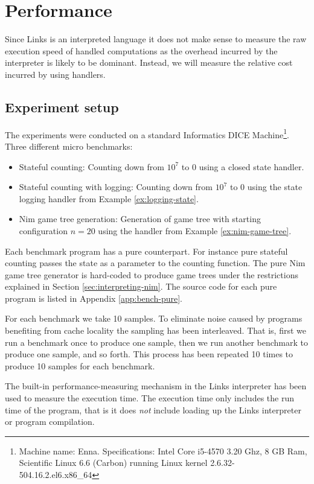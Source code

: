 \section{Performance}\label{sec:eval-performance}
Since Links is an interpreted language it does not make sense to measure the raw execution speed of handled computations as the overhead incurred by the interpreter is likely to be dominant. Instead, we will measure the relative cost incurred by using handlers.

\subsection{Experiment setup}
The experiments were conducted on a standard Informatics DICE Machine\footnote{Machine name: Enna. Specifications: Intel Core i5-4570 3.20 Ghz, 8 GB Ram, Scientific Linux 6.6 (Carbon) running Linux kernel 2.6.32-504.16.2.el6.x86\_64}. Three different micro benchmarks:
\begin{itemize}
  \item Stateful counting: Counting down from $10^7$ to $0$ using a closed state handler.
  \item Stateful counting with logging: Counting down from $10^7$ to $0$ using the state logging handler from Example \ref{ex:logging-state}.
  \item Nim game tree generation: Generation of game tree with starting configuration $n = 20$ using the handler from Example \ref{ex:nim-game-tree}.
\end{itemize}
Each benchmark program has a pure counterpart. For instance pure stateful counting passes the state as a parameter to the counting function. The pure Nim game tree generator is hard-coded to produce game trees under the restrictions explained in Section \ref{sec:interpreting-nim}. The source code for each pure program is listed in Appendix \ref{app:bench-pure}.

For each benchmark we take 10 samples. To eliminate noise caused by programs benefiting from cache locality the sampling has been interleaved. That is, first we run a benchmark once to produce one sample, then we run another benchmark to produce one sample, and so forth. This process has been repeated 10 times to produce 10 samples for each benchmark.

The built-in performance-measuring mechanism in the Links interpreter has been used to measure the execution time. The execution time only includes the run time of the program, that is it does \emph{not} include loading up the Links interpreter or program compilation.
